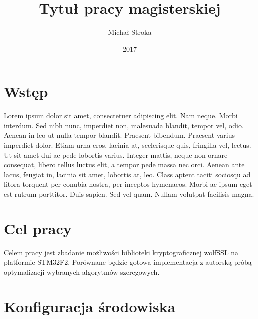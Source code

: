 \documentclass[oneside]{mgr}
\title{Tytuł pracy magisterskiej}
\author{Michał Stroka}
\date{2017} %
\begin{document}

\maketitle

\tableofcontents %

\chapter{Wstęp}
Lorem ipsum dolor sit amet, consectetuer adipiscing elit. Nam
neque. Morbi interdum. Sed nibh nunc, imperdiet non, malesuada
blandit, tempor vel, odio. Aenean in leo ut nulla tempor
blandit. Praesent bibendum. Praesent varius imperdiet dolor. Etiam
urna eros, lacinia at, scelerisque quis, fringilla vel, lectus. Ut sit
amet dui ac pede lobortis varius. Integer mattis, neque non ornare
consequat, libero tellus luctus elit, a tempor pede massa nec
orci. Aenean ante lacus, feugiat in, lacinia sit amet, lobortis at,
leo. Class aptent taciti sociosqu ad litora torquent per conubia
nostra, per inceptos hymenaeos. Morbi ac ipsum eget est rutrum
porttitor. Duis sapien. Sed vel quam. Nullam volutpat facilisis magna.

\chapter{Cel pracy}

Celem pracy jest zbadanie możliwości biblioteki kryptograficznej wolfSSL na platformie STM32F2.
Porównane będzie gotowa implementacja z autorską próbą optymalizacji wybranych algorytmów szeregowych.


\chapter{Konfiguracja środowiska}
\end{document}

